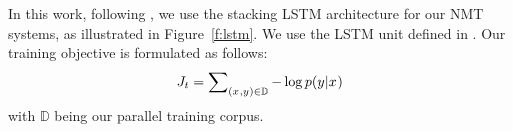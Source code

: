 In this work, following \cite{sutskever14,luong15}, we use the stacking LSTM architecture for our NMT systems, as illustrated in Figure~\ref{f:lstm}.
We use the LSTM unit defined in \cite{zaremba15}. Our training objective is formulated as follows:
\begin{equation}
J_t = \sum_{(x_{},y_{}) \in \mathbb{D}} \nolimits -\log p(y_{}|x_{})
\label{e:j_t}
\end{equation}
with $\mathbb{D}$ being our parallel training corpus.
